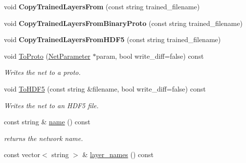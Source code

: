 \begin{DoxyCompactItemize}
\mbox{\label{classcaffe_1_1_net_ad5e222ad89011558cee681133e5c610b}} 
void {\bfseries Copy\+Trained\+Layers\+From} (const string trained\+\_\+filename)
\item 
\mbox{\label{classcaffe_1_1_net_ad9bb09568db19316e9604eb8cbd15f6d}} 
void {\bfseries Copy\+Trained\+Layers\+From\+Binary\+Proto} (const string trained\+\_\+filename)
\item 
\mbox{\label{classcaffe_1_1_net_ab84341fd27c8c573f00c517bea051c2b}} 
void {\bfseries Copy\+Trained\+Layers\+From\+H\+D\+F5} (const string trained\+\_\+filename)
\item 
\mbox{\label{classcaffe_1_1_net_a6ce42e3be6f7b495fe2fea85db2e99f8}} 
void \mbox{\hyperlink{classcaffe_1_1_net_a6ce42e3be6f7b495fe2fea85db2e99f8}{To\+Proto}} (\mbox{\hyperlink{classcaffe_1_1_net_parameter}{Net\+Parameter}} $\ast$param, bool write\+\_\+diff=false) const
\begin{DoxyCompactList}\small\item\em Writes the net to a proto. \end{DoxyCompactList}\item 
\mbox{\label{classcaffe_1_1_net_ad3ac317bbc872bc6ed48d19f4d986ecc}} 
void \mbox{\hyperlink{classcaffe_1_1_net_ad3ac317bbc872bc6ed48d19f4d986ecc}{To\+H\+D\+F5}} (const string \&filename, bool write\+\_\+diff=false) const
\begin{DoxyCompactList}\small\item\em Writes the net to an H\+D\+F5 file. \end{DoxyCompactList}\item 
\mbox{\label{classcaffe_1_1_net_a521c084f91eefc041bd53f30f1cc1097}} 
const string \& \mbox{\hyperlink{classcaffe_1_1_net_a521c084f91eefc041bd53f30f1cc1097}{name}} () const
\begin{DoxyCompactList}\small\item\em returns the network name. \end{DoxyCompactList}\item 
\mbox{\label{classcaffe_1_1_net_aa550ba424fc7b90f2ccbbaa175c1ec18}} 
const vector$<$ string $>$ \& \mbox{\hyperlink{classcaffe_1_1_net_aa550ba424fc7b90f2ccbbaa175c1ec18}{layer\+\_\+names}} () const

\end{DoxyCompactItemize}
